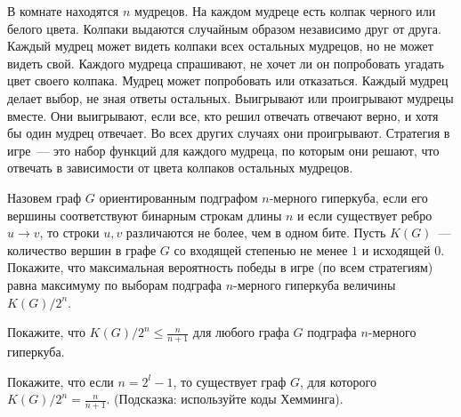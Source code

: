 В комнате находятся $n$ мудрецов. На каждом мудреце есть колпак черного или белого цвета. Колпаки выдаются случайным образом
независимо друг от друга. Каждый мудрец может видеть колпаки всех остальных мудрецов, но не может видеть свой. Каждого
мудреца спрашивают, не хочет ли он попробовать угадать цвет своего колпака. Мудрец может попробовать или отказаться. Каждый
мудрец делает выбор, не зная ответы остальных. Выигрывают или проигрывают мудрецы вместе. Они выигрывают, если все, кто решил
отвечать отвечают верно, и хотя бы один мудрец отвечает. Во всех других случаях они проигрывают. Стратегия в игре~--- это
набор функций для каждого мудреца, по которым они решают, что отвечать в зависимости от цвета колпаков остальных мудрецов.
\begin{enumcyr}
    \item Назовем граф $G$ ориентированным подграфом $n$-мерного гиперкуба, если его вершины соответствуют бинарным строкам
    	длины $n$ и если существует ребро $u \rightarrow v$, то строки $u, v$ различаются не более, чем в одном бите. Пусть
        $K(G)$~--- количество вершин в графе $G$ со входящей степенью не менее $1$ и исходящей $0$. Покажите, что
        максимальная вероятность победы в игре (по всем стратегиям) равна максимуму по выборам подграфа $n$-мерного гиперкуба
        величины $K(G) / 2^n$.
    \item Покажите, что $K(G) / 2^n \le \frac{n}{n + 1}$ для любого графа $G$ подграфа $n$-мерного гиперкуба.
    \item Покажите, что если $n = 2^l - 1$, то существует граф $G$, для которого $K(G) / 2^n = \frac{n}{n + 1}$. (Подсказка:
	    используйте коды Хемминга).
\end{enumcyr}